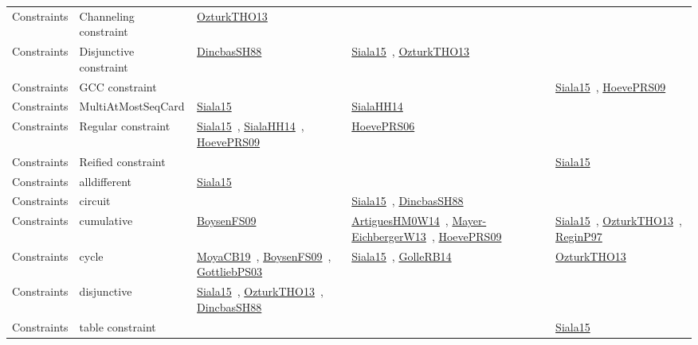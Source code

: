 {\begin{longtable}{lp{3cm}>{\raggedright\arraybackslash}p{6cm}>{\raggedright\arraybackslash}p{6cm}>{\raggedright\arraybackslash}p{8cm}}
Constraints & Channeling constraint & \href{../cars/works/OzturkTHO13.pdf}{OzturkTHO13}~\cite{OzturkTHO13} &  & \\
Constraints & Disjunctive constraint & \href{../cars/works/DincbasSH88.pdf}{DincbasSH88}~\cite{DincbasSH88} & \href{../cars/works/Siala15.pdf}{Siala15}~\cite{Siala15}, \href{../cars/works/OzturkTHO13.pdf}{OzturkTHO13}~\cite{OzturkTHO13} & \\
Constraints & GCC constraint &  &  & \href{../cars/works/Siala15.pdf}{Siala15}~\cite{Siala15}, \href{../cars/works/HoevePRS09.pdf}{HoevePRS09}~\cite{HoevePRS09}\\
Constraints & MultiAtMostSeqCard & \href{../cars/works/Siala15.pdf}{Siala15}~\cite{Siala15} & \href{../cars/works/SialaHH14.pdf}{SialaHH14}~\cite{SialaHH14} & \\
Constraints & Regular constraint & \href{../cars/works/Siala15.pdf}{Siala15}~\cite{Siala15}, \href{../cars/works/SialaHH14.pdf}{SialaHH14}~\cite{SialaHH14}, \href{../cars/works/HoevePRS09.pdf}{HoevePRS09}~\cite{HoevePRS09} & \href{../cars/works/HoevePRS06.pdf}{HoevePRS06}~\cite{HoevePRS06} & \\
Constraints & Reified constraint &  &  & \href{../cars/works/Siala15.pdf}{Siala15}~\cite{Siala15}\\
Constraints & alldifferent & \href{../cars/works/Siala15.pdf}{Siala15}~\cite{Siala15} &  & \\
Constraints & circuit &  & \href{../cars/works/Siala15.pdf}{Siala15}~\cite{Siala15}, \href{../cars/works/DincbasSH88.pdf}{DincbasSH88}~\cite{DincbasSH88} & \\
Constraints & cumulative & \href{../cars/works/BoysenFS09.pdf}{BoysenFS09}~\cite{BoysenFS09} & \href{../cars/works/ArtiguesHM0W14.pdf}{ArtiguesHM0W14}~\cite{ArtiguesHM0W14}, \href{../cars/works/Mayer-EichbergerW13.pdf}{Mayer-EichbergerW13}~\cite{Mayer-EichbergerW13}, \href{../cars/works/HoevePRS09.pdf}{HoevePRS09}~\cite{HoevePRS09} & \href{../cars/works/Siala15.pdf}{Siala15}~\cite{Siala15}, \href{../cars/works/OzturkTHO13.pdf}{OzturkTHO13}~\cite{OzturkTHO13}, \href{../cars/works/ReginP97.pdf}{ReginP97}~\cite{ReginP97}\\
Constraints & cycle & \href{../cars/works/MoyaCB19.pdf}{MoyaCB19}~\cite{MoyaCB19}, \href{../cars/works/BoysenFS09.pdf}{BoysenFS09}~\cite{BoysenFS09}, \href{../cars/works/GottliebPS03.pdf}{GottliebPS03}~\cite{GottliebPS03} & \href{../cars/works/Siala15.pdf}{Siala15}~\cite{Siala15}, \href{../cars/works/GolleRB14.pdf}{GolleRB14}~\cite{GolleRB14} & \href{../cars/works/OzturkTHO13.pdf}{OzturkTHO13}~\cite{OzturkTHO13}\\
Constraints & disjunctive & \href{../cars/works/Siala15.pdf}{Siala15}~\cite{Siala15}, \href{../cars/works/OzturkTHO13.pdf}{OzturkTHO13}~\cite{OzturkTHO13}, \href{../cars/works/DincbasSH88.pdf}{DincbasSH88}~\cite{DincbasSH88} &  & \\
Constraints & table constraint &  &  & \href{../cars/works/Siala15.pdf}{Siala15}~\cite{Siala15}\\
\end{longtable}
}

